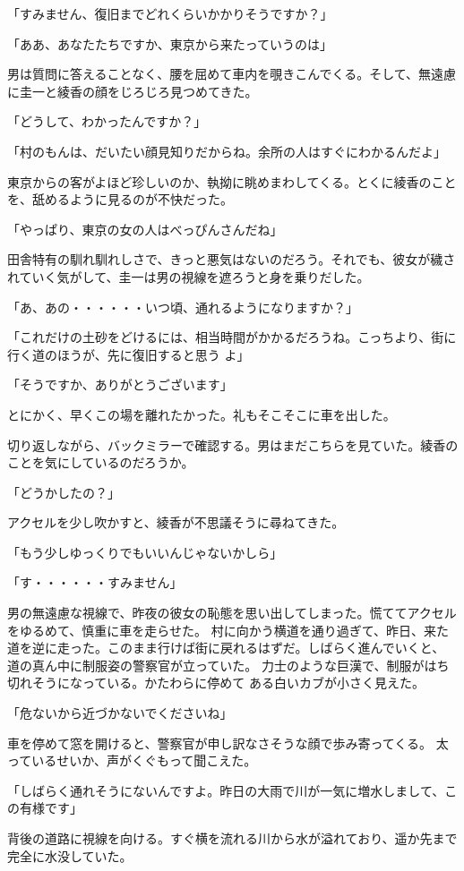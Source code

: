 ﻿\documentclass[book,tate]{jlreq}
\begin{document}
「すみません、復旧までどれくらいかかりそうですか？」

「ああ、あなたたちですか、東京から来たっていうのは」

男は質問に答えることなく、腰を屈めて車内を覗きこんでくる。そして、無遠慮に圭一と綾香の顔をじろじろ見つめてきた。

「どうして、わかったんですか？」

「村のもんは、だいたい顔見知りだからね。余所の人はすぐにわかるんだよ」

東京からの客がよほど珍しいのか、執拗に眺めまわしてくる。とくに綾香のことを、舐めるように見るのが不快だった。

「やっぱり、東京の女の人はべっぴんさんだね」

田舎特有の馴れ馴れしさで、きっと悪気はないのだろう。それでも、彼女が穢されていく気がして、圭一は男の視線を遮ろうと身を乗りだした。

「あ、あの・・・・・・いつ頃、通れるようになりますか？」

「これだけの土砂をどけるには、相当時間がかかるだろうね。こっちより、街に行く道のほうが、先に復旧すると思う よ」

「そうですか、ありがとうございます」

とにかく、早くこの場を離れたかった。礼もそこそこに車を出した。

切り返しながら、バックミラーで確認する。男はまだこちらを見ていた。綾香のことを気にしているのだろうか。

「どうかしたの？」

アクセルを少し吹かすと、綾香が不思議そうに尋ねてきた。

「もう少しゆっくりでもいいんじゃないかしら」

「す・・・・・・すみません」

男の無遠慮な視線で、昨夜の彼女の恥態を思い出してしまった。慌ててアクセルをゆるめて、慎重に車を走らせた。 村に向かう横道を通り過ぎて、昨日、来た道を逆に走った。このまま行けば街に戻れるはずだ。しばらく進んでいくと、 道の真ん中に制服姿の警察官が立っていた。 力士のような巨漢で、制服がはち切れそうになっている。かたわらに停めて ある白いカブが小さく見えた。

「危ないから近づかないでくださいね」

車を停めて窓を開けると、警察官が申し訳なさそうな顔で歩み寄ってくる。 太っているせいか、声がくぐもって聞こえた。

「しばらく通れそうにないんですよ。昨日の大雨で川が一気に増水しまして、この有様です」

背後の道路に視線を向ける。すぐ横を流れる川から水が溢れており、遥か先まで完全に水没していた。
\end{document}

